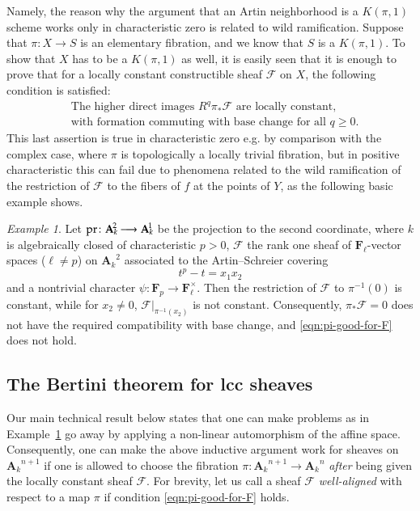 \documentclass[twoside]{amsart}
\renewcommand{\AA}{\mathbf{A}}
\newcommand{\FF}{\mathbf{F}}
\newcommand{\Ff}{\mathscr{F}}
\newcommand{\ANK}[2]{{\AA_{#2}}^{\! \! \! \!  #1}} %
\newcommand{\AN}[1]{\ANK{#1}{k}}
\renewcommand{\to}{\longrightarrow}
\theoremstyle{plain}
\theoremstyle{definition}
\theoremstyle{remark}
\newtheorem{example}[subsubsection]{Example}
\numberwithin{equation}{subsection}
\begin{document}
Namely, the reason why the argument that an Artin neighborhood is a $K(\pi, 1)$ scheme works only in characteristic zero is related to wild ramification. Suppose that $\pi\colon X\to S$ is an elementary fibration, and we know that $S$ is a $K(\pi, 1)$. To show that $X$ has to be a $K(\pi,1)$ as well, it is easily seen that it is enough to prove that for a locally constant constructible sheaf $\Ff$ on $X$, the following condition is satisfied:
\begin{equation} \label{eqn:pi-good-for-F}
	\begin{aligned}
		&\text{The higher direct images } R^q \pi_* \Ff\text{ are locally constant,} \\ 
		&\text{with formation commuting with base change for all }q\geq 0. 
	\end{aligned}
\end{equation}
This last assertion is true in characteristic zero e.g. by comparison with the complex case, where $\pi$ is topologically a locally trivial fibration, but in positive characteristic this can fail due to phenomena related to the wild ramification of the restriction of $\Ff$ to the fibers of $f$ at the points of $Y$, as the following basic example shows.

\begin{example} \label{ex:basic}
Let ${\rm pr}\colon \AN 2 \to \AN 1$ be the projection to the second coordinate, where $k$ is algebraically closed of characteristic $p>0$, $\Ff$ the rank one sheaf of $\FF_\ell$-vector spaces ($\ell\neq p$) on $\AN 2$ associated to the Artin--Schreier covering
\[ 
	t^p - t = x_1 x_2
\]
and a nontrivial character $\psi\colon \FF_p \to \FF_\ell^\times$. Then the restriction of $\Ff$ to $\pi^{-1}(0)$ is constant, while for $x_2\neq 0$, $\Ff|_{\pi^{-1}(x_2)}$ is not constant. Consequently, $\pi_* \Ff = 0$ does not have the required compatibility with base change, and \eqref{eqn:pi-good-for-F} does not hold.
\end{example}

\subsection{The Bertini theorem for lcc sheaves}

Our main technical result below states that one can make problems as in Example~\ref{ex:basic} go away by applying a non-linear automorphism of the affine space. Consequently, one can make the above inductive argument work for sheaves on $\AN {n+1}$ if one is allowed to choose the fibration $\pi\colon \AN{n+1} \to \AN n$ \emph{after} being given the locally constant sheaf $\Ff$. For brevity, let us call a sheaf $\Ff$ \emph{well-aligned} with respect to a map $\pi$ if condition \eqref{eqn:pi-good-for-F} holds.
\end{document}
